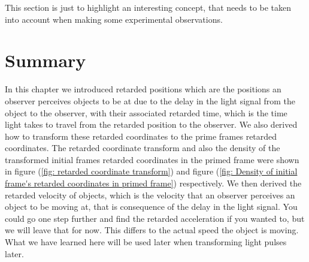 This section is just to highlight an interesting concept, that needs to be taken into account when making some experimental observations.






\section{Summary}\label{sect: Summary chapter 3}

In this chapter we introduced retarded positions which are the positions an observer perceives objects to be at due to the delay in the light signal from the object to the observer, with their associated retarded time, which is the time light takes to travel from the retarded position to the observer.
We also derived how to transform these retarded coordinates to the prime frames retarded coordinates.
The retarded coordinate transform and also the density of the transformed initial frames retarded coordinates in the primed frame were shown in figure (\ref{fig: retarded coordinate transform}) and figure (\ref{fig: Density of initial frame's retarded coordinates in primed frame}) respectively.
We then derived the retarded velocity of objects, which is the velocity that an observer perceives an object to be moving at, that is consequence of the delay in the light signal.
You could go one step further and find the retarded acceleration if you wanted to, but we will leave that for now.
This differs to the actual speed the object is moving.
What we have learned here will be used later when transforming light pulses later.


